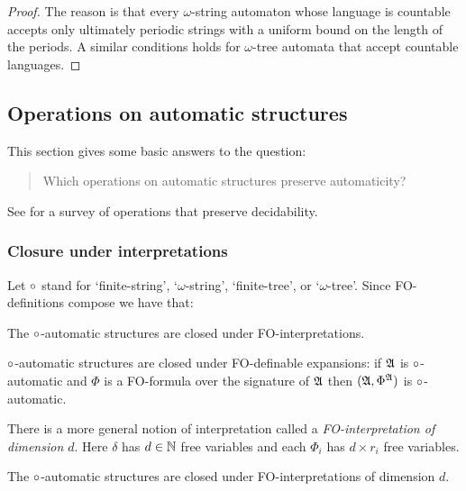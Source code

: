 \begin{proof}
The reason is that every $\omega$-string automaton whose language is countable accepts only ultimately periodic strings with a uniform bound on the length of the periods. A similar conditions holds for $\omega$-tree automata that accept countable languages.
\end{proof}
%
\subsection{Operations on automatic structures}

This section gives some basic answers to the question:
\begin{quote}
Which operations on automatic structures preserve automaticity?
\end{quote}
 See \cite{BCL07} for a survey of operations that preserve decidability.
 
\subsubsection*{Closure under interpretations}
Let $\circ$ stand for `finite-string', `$\omega$-string', `finite-tree', or `$\omega$-tree'.
Since FO-definitions compose we have that:
\begin{proposition} \cite{Blum99}
The $\circ$-automatic structures are closed under FO-interpretations.
\end{proposition}

\begin{example}
$\circ$-automatic structures are closed under FO-definable expansions: if $\mathfrak{A}$ is $\circ$-automatic and $\Phi$ is a FO-formula over the signature of $\mathfrak{A}$ then $(\mathfrak{A},\Phi^{\mathfrak{A}})$ is $\circ$-automatic.
\end{example}

There is a more general notion of interpretation called a {\em FO-interpretation of dimension $d$}.
Here $\delta$ has $d \in \mathbb{N}$ free variables and each $\Phi_i$ has $d\times r_i$ free variables.

\begin{proposition} \cite{BlGr00}
The $\circ$-automatic structures are closed under  FO-interpretations of dimension $d$.
\end{proposition}

